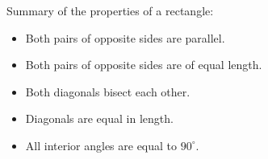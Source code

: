 

Summary of the properties of a rectangle:\par 
\begin{itemize}[noitemsep]
\item Both pairs of opposite sides are parallel.
\item Both pairs of opposite sides are of equal length.
\item Both diagonals bisect each other.
\item Diagonals are equal in length.
\item All interior angles are equal to $90^{\circ}$.
\end{itemize}

